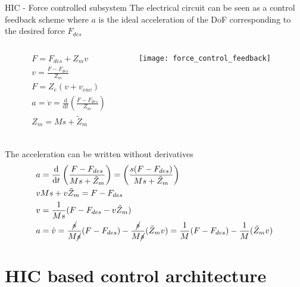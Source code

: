 \begin{frame}[shrink=30]{HIC - Force controlled subsystem}
  The electrical circuit can be seen as a control feedback scheme where $a$ is the ideal
  acceleration of the DoF corresponding to the desired force $F_{des}$
  \begin{columns}
    \begin{column}{0.4\textwidth}
      \begin{align*}
        &F = F_{des} + Z_m v\\
        &v = \frac{F - F_{des}}{Z_m}\\
        &F = Z_e(v + v_{env})\\
        &a = \dot{v} = \frac{\mathrm{d}}{\mathrm{d}t} \left(\frac{F - F_{des}}{Z_m} \right)\\
        &Z_m = M s + \tilde{Z}_m\\
      \end{align*}
    \end{column}
    \begin{column}{0.5\textwidth}
      \centering
      \texttt{[image: force\_control\_feedback]}
    \end{column}
  \end{columns}
  The acceleration can be written without derivatives
  \begin{align*}
    &a = \frac{\mathrm{d}}{\mathrm{d}t} \left(\frac{F - F_{des}}{Ms + \tilde{Z}_m} \right) = \left(\frac{s(F - F_{des})}{Ms + \tilde{Z}_m} \right)\\
    &vMs + v \tilde{Z}_m = F - F_{des}\\
    &v = \frac{1}{Ms} (F - F_{des} - v \tilde{Z}_m )\\
    &a = \dot{v} = \frac{\cancel{s}}{M\cancel{s}} (F - F_{des}) - \frac{\cancel{s}}{M\cancel{s}}( \tilde{Z}_m v) = \frac{1}{M} (F - F_{des}) - \frac{1}{M}( \tilde{Z}_m v)
  \end{align*}
\end{frame}

\section{HIC based control architecture}

